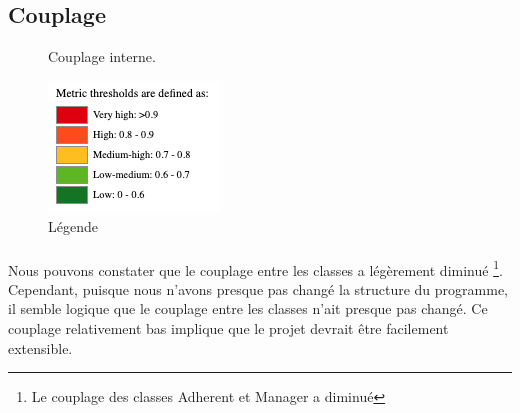 \newpage
\subsection{Couplage}
    \begin{figure}[h!]
        \centering
        \qquad
        \caption{Couplage interne.}
        \label{fig:couplage_interne}
    \end{figure}
    \begin{figure}[h!]
        \centering
        \includegraphics{Figures/Legend.png}
        \caption{Légende}
    \end{figure}
    \paragraph{}
    Nous pouvons constater que le couplage entre les classes a légèrement diminué \footnote{Le couplage des classes Adherent et Manager a diminué}. Cependant, puisque nous n'avons presque pas changé la structure du programme, il semble logique que le couplage entre les classes n'ait presque pas changé. Ce couplage relativement bas implique que le projet devrait être facilement extensible.

